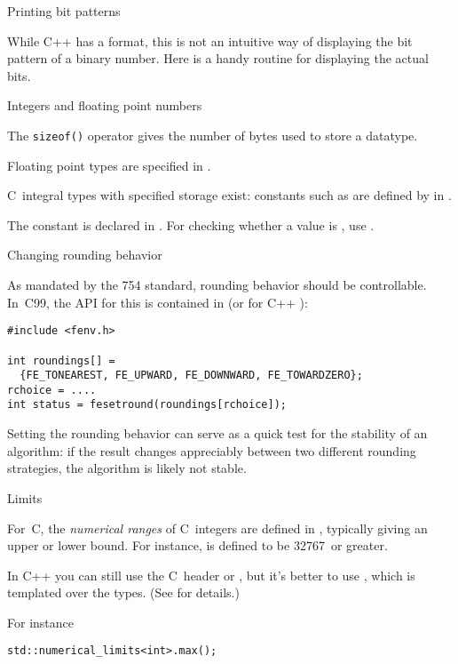 
 {Printing bit patterns}

While C++ has a  format,
this is not an intuitive way of displaying the bit pattern of a
binary number.
Here is a handy routine for displaying the actual bits.


 {Integers and floating point numbers}
\label{sec:sizeof}

The \texttt{sizeof()} operator gives the
number of bytes used to store a datatype.

Floating point types are specified in .

C~integral types with specified storage exist: constants such as
 are defined by  in .

The constant  is declared in .
For checking whether a value is , use .

 {Changing rounding behavior}
\label{sec:fenvh}

As mandated by the 754 standard, rounding behavior should be controllable.
In~C99, the API for this is contained in  (or for
C++ ):
\begin{verbatim}
#include <fenv.h>

int roundings[] =
  {FE_TONEAREST, FE_UPWARD, FE_DOWNWARD, FE_TOWARDZERO};
rchoice = ....
int status = fesetround(roundings[rchoice]);            
\end{verbatim}

Setting the rounding behavior can serve as a quick test for the stability
of an algorithm: if the result changes appreciably between two different
rounding strategies, the algorithm is likely not stable.

 {Limits}

For~C,
the \emph{numerical ranges}
of C~integers are defined in ,
typically giving an upper or lower bound.
For instance,  is defined to be 32767~or greater.

In C++
you can still use the C~header  or
, but it's better to use
, which is templated over the types.
(See  for details.)

For instance
\lstset{language=C++}
\begin{lstlisting}
std::numerical_limits<int>.max();
\end{lstlisting}

